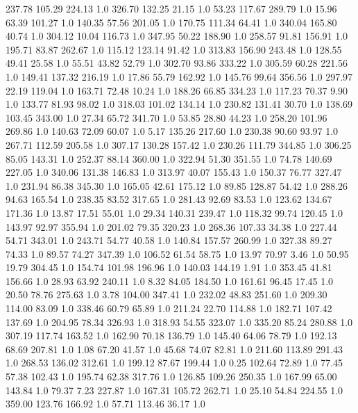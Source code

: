   237.78   105.29   224.13  1.0
  326.70   132.25    21.15  1.0
   53.23   117.67   289.79  1.0
   15.96    63.39   101.27  1.0
  140.35    57.56   201.05  1.0
  170.75   111.34    64.41  1.0
  340.04   165.80    40.74  1.0
  304.12    10.04   116.73  1.0
  347.95    50.22   188.90  1.0
  258.57    91.81   156.91  1.0
  195.71    83.87   262.67  1.0
  115.12   123.14    91.42  1.0
  313.83   156.90   243.48  1.0
  128.55    49.41    25.58  1.0
   55.51    43.82    52.79  1.0
  302.70    93.86   333.22  1.0
  305.59    60.28   221.56  1.0
  149.41   137.32   216.19  1.0
   17.86    55.79   162.92  1.0
  145.76    99.64   356.56  1.0
  297.97    22.19   119.04  1.0
  163.71    72.48    10.24  1.0
  188.26    66.85   334.23  1.0
  117.23    70.37     9.90  1.0
  133.77    81.93    98.02  1.0
  318.03   101.02   134.14  1.0
  230.82   131.41    30.70  1.0
  138.69   103.45   343.00  1.0
   27.34    65.72   341.70  1.0
   53.85    28.80    44.23  1.0
  258.20   101.96   269.86  1.0
  140.63    72.09    60.07  1.0
    5.17   135.26   217.60  1.0
  230.38    90.60    93.97  1.0
  267.71   112.59   205.58  1.0
  307.17   130.28   157.42  1.0
  230.26   111.79   344.85  1.0
  306.25    85.05   143.31  1.0
  252.37    88.14   360.00  1.0
  322.94    51.30   351.55  1.0
   74.78   140.69   227.05  1.0
  340.06   131.38   146.83  1.0
  313.97    40.07   155.43  1.0
  150.37    76.77   327.47  1.0
  231.94    86.38   345.30  1.0
  165.05    42.61   175.12  1.0
   89.85   128.87    54.42  1.0
  288.26    94.63   165.54  1.0
  238.35    83.52   317.65  1.0
  281.43    92.69    83.53  1.0
  123.62   134.67   171.36  1.0
   13.87    17.51    55.01  1.0
   29.34   140.31   239.47  1.0
  118.32    99.74   120.45  1.0
  143.97    92.97   355.94  1.0
  201.02    79.35   320.23  1.0
  268.36   107.33    34.38  1.0
  227.44    54.71   343.01  1.0
  243.71    54.77    40.58  1.0
  140.84   157.57   260.99  1.0
  327.38    89.27    74.33  1.0
   89.57    74.27   347.39  1.0
  106.52    61.54    58.75  1.0
   13.97    70.97     3.46  1.0
   50.95    19.79   304.45  1.0
  154.74   101.98   196.96  1.0
  140.03   144.19     1.91  1.0
  353.45    41.81   156.66  1.0
   28.93    63.92   240.11  1.0
    8.32    84.05   184.50  1.0
  161.61    96.45    17.45  1.0
   20.50    78.76   275.63  1.0
    3.78   104.00   347.41  1.0
  232.02    48.83   251.60  1.0
  209.30   114.00    83.09  1.0
  338.46    60.79    65.89  1.0
  211.24    22.70   114.88  1.0
  182.71   107.42   137.69  1.0
  204.95    78.34   326.93  1.0
  318.93    54.55   323.07  1.0
  335.20    85.24   280.88  1.0
  307.19   117.74   163.52  1.0
  162.90    70.18   136.79  1.0
  145.40    64.06    78.79  1.0
  192.13    68.69   207.81  1.0
    1.08    67.20    41.57  1.0
   45.68    74.07    82.81  1.0
  211.60   113.89   291.43  1.0
  268.53   136.02   312.61  1.0
  199.12    87.67   199.44  1.0
    0.25   102.64    72.89  1.0
   77.45    57.38   102.43  1.0
  195.74    62.38   317.76  1.0
  126.85   109.26   250.35  1.0
  167.99    65.00   143.84  1.0
   79.37     7.23   227.87  1.0
  167.31   105.72   262.71  1.0
   25.10    54.84   224.55  1.0
  359.00   123.76   166.92  1.0
   57.71   113.46    36.17  1.0
